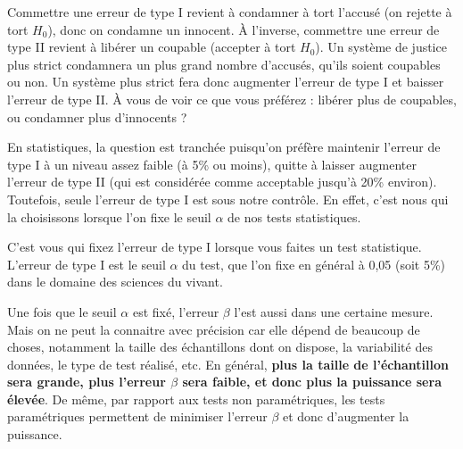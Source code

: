 \documentclass[
  french,
  a4paper,
  DIV=11,
  numbers=noendperiod,
  oneside]{scrreprt}
\begin{document}
Commettre une erreur de type I revient à condamner à tort l'accusé (on
rejette à tort \(H_0\)), donc on condamne un innocent. À l'inverse,
commettre une erreur de type II revient à libérer un coupable (accepter
à tort \(H_0\)). Un système de justice plus strict condamnera un plus
grand nombre d'accusés, qu'ils soient coupables ou non. Un système plus
strict fera donc augmenter l'erreur de type I et baisser l'erreur de
type II. À vous de voir ce que vous préférez : libérer plus de
coupables, ou condamner plus d'innocents ?

En statistiques, la question est tranchée puisqu'on préfère maintenir
l'erreur de type I à un niveau assez faible (à 5\% ou moins), quitte à
laisser augmenter l'erreur de type II (qui est considérée comme
acceptable jusqu'à 20\% environ). Toutefois, seule l'erreur de type I
est sous notre contrôle. En effet, c'est nous qui la choisissons lorsque
l'on fixe le seuil \(\alpha\) de nos tests statistiques.

\begin{tcolorbox}[enhanced jigsaw, arc=.35mm, bottomrule=.15mm, bottomtitle=1mm, breakable, colback=white, colbacktitle=quarto-callout-important-color!10!white, colframe=quarto-callout-important-color-frame, coltitle=black, left=2mm, leftrule=.75mm, opacityback=0, opacitybacktitle=0.6, rightrule=.15mm, title=\textcolor{quarto-callout-important-color}{\faExclamation}\hspace{0.5em}{À retenir}, titlerule=0mm, toprule=.15mm, toptitle=1mm]

C'est vous qui fixez l'erreur de type I lorsque vous faites un test
statistique. L'erreur de type I est le seuil \(\alpha\) du test, que
l'on fixe en général à 0,05 (soit 5\%) dans le domaine des sciences du
vivant.

\end{tcolorbox}

Une fois que le seuil \(\alpha\) est fixé, l'erreur \(\beta\) l'est
aussi dans une certaine mesure. Mais on ne peut la connaitre avec
précision car elle dépend de beaucoup de choses, notamment la taille des
échantillons dont on dispose, la variabilité des données, le type de
test réalisé, etc. En général, \textbf{plus la taille de l'échantillon
sera grande, plus l'erreur \(\beta\) sera faible, et donc plus la
puissance sera élevée}. De même, par rapport aux tests non
paramétriques, les tests paramétriques permettent de minimiser l'erreur
\(\beta\) et donc d'augmenter la puissance.
\end{document}
